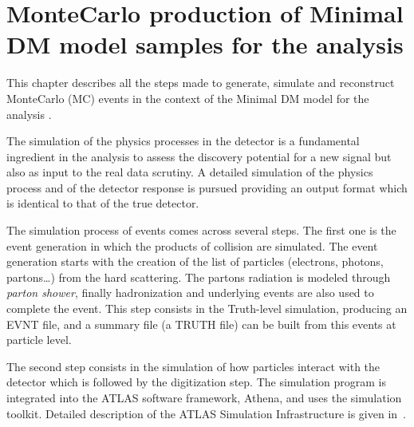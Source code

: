 \chapter[MonteCarlo sample production]{MonteCarlo production of Minimal DM model samples for the \mph analysis}

\lettrine{T}{}his chapter describes all the steps made to generate, simulate and reconstruct MonteCarlo (MC) events in the context of the Minimal DM model for the \mph analysis .


The simulation of the physics processes in the detector is a fundamental ingredient in the analysis to assess the discovery potential for a new signal but also as input to the real data scrutiny.
A detailed simulation  of the physics process and of the detector response is pursued providing an output format which is identical to that of the true detector. 

The simulation process of events comes across several steps. The first one is the event generation in which the products of \pp collision are simulated. The event generation starts with the creation of the list of particles (electrons, photons, partons\dots) from the hard scattering. The partons radiation is modeled through \emph{parton shower}, finally hadronization and underlying events are also used to complete the event. This step consists in the Truth-level simulation, producing an EVNT file, and a summary file (a TRUTH file) can be built from this events at particle level.

The second step consists in the simulation of how particles interact with the detector which is followed by the digitization step. The simulation program is integrated into the ATLAS software framework, Athena, and uses the \geant \cite{geant4} simulation toolkit. Detailed description of the ATLAS Simulation Infrastructure is given in~\cite{simulation}.

